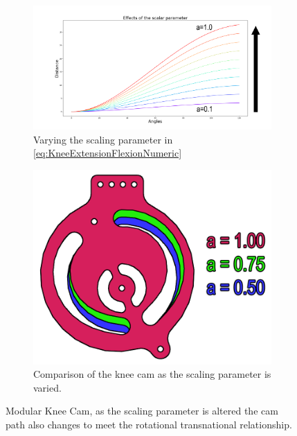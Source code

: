 \begin{figure}
    \centering
    \begin{subfigure}{\columnwidth}
        \centering
        \includegraphics[width=\columnwidth]{images/mech_design/scalar_varying_a_Annotated.png}
        \caption[Scaling Parameter]{Varying the scaling parameter in \autoref{eq:KneeExtensionFlexionNumeric} }
        \label{fig:a_varying}
    \end{subfigure}
    \begin{subfigure}{\columnwidth}
        \centering
        \includegraphics[scale=0.35]{images/mech_design/knee_model.png}
        \caption[Comparison of the Knee Cam]{Comparison of the knee cam as the scaling parameter is varied.}
        \label{fig:KneePlateDesign}
    \end{subfigure}
    \caption[Modular Knee Cam]{Modular Knee Cam, as the scaling parameter is altered the cam path also changes to meet the rotational \rightarrow transnational relationship.}
    \label{fig:kneecam}
\end{figure}




